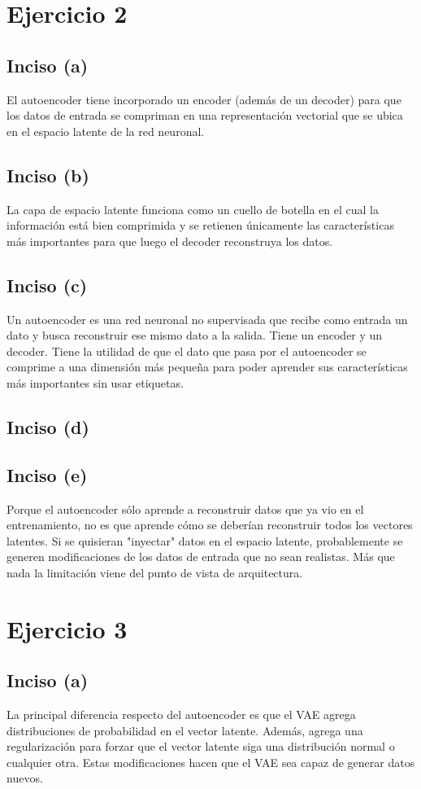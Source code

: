 \documentclass[12pt, a4paper]{article}
\begin{document}
    \section*{Ejercicio 2}
        \subsection*{Inciso (a)}
            \noindent El autoencoder tiene incorporado un encoder (además de un decoder) para que los datos de entrada se compriman en una representación vectorial que se ubica en el espacio latente de la red neuronal.
        \subsection*{Inciso (b)}
            \noindent La capa de espacio latente funciona como un cuello de botella en el cual la información está bien comprimida y se retienen únicamente las características más importantes para que luego el decoder reconstruya los datos.
        \subsection*{Inciso (c)}
            \noindent Un autoencoder es una red neuronal no supervisada que recibe como entrada un dato y busca reconstruir ese mismo dato a la salida. Tiene un encoder y un decoder. Tiene la utilidad de que el dato que pasa por el autoencoder se comprime a una dimensión más pequeña para poder aprender sus características más importantes sin usar etiquetas.
        \subsection*{Inciso (d)}
        \subsection*{Inciso (e)}
            \noindent Porque el autoencoder sólo aprende a reconstruir datos que ya vio en el entrenamiento, no es que aprende cómo se deberían reconstruir todos los vectores latentes. Si se quisieran "inyectar" datos en el espacio latente, probablemente se generen modificaciones de los datos de entrada que no sean realistas. Más que nada la limitación viene del punto de vista de arquitectura.
    \section*{Ejercicio 3}
        \subsection*{Inciso (a)}
            \noindent La principal diferencia respecto del autoencoder es que el VAE agrega distribuciones de probabilidad en el vector latente. Además, agrega una regularización para forzar que el vector latente siga una distribución normal o cualquier otra. Estas modificaciones hacen que el VAE sea capaz de generar datos nuevos.
\end{document}
